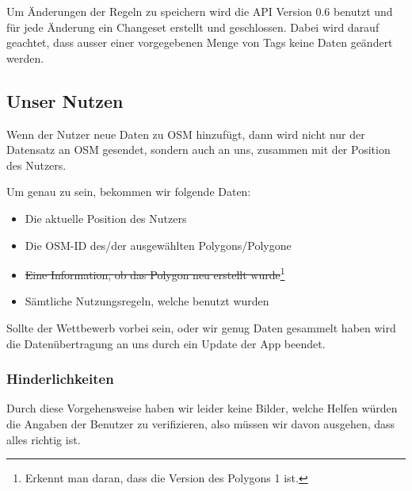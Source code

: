 Um Änderungen der Regeln zu speichern wird die API Version 0.6 benutzt und für jede Änderung ein Changeset erstellt und geschlossen.
Dabei wird darauf geachtet, dass ausser einer vorgegebenen Menge von Tags keine Daten geändert werden.

\subsection{Unser Nutzen}
Wenn der Nutzer neue Daten zu OSM hinzufügt, dann wird nicht nur der Datensatz an OSM gesendet, sondern auch an uns, zusammen mit der Position des Nutzers.

Um genau zu sein, bekommen wir folgende Daten:
\begin{itemize}
\item Die aktuelle Position des Nutzers
\item Die OSM-ID des/der ausgewählten Polygons/Polygone
\item \sout{Eine Information, ob das Polygon neu erstellt wurde}\footnote{Erkennt man daran, dass die Version des Polygons 1 ist.}
\item Sämtliche Nutzungsregeln, welche benutzt wurden
\end{itemize}
Sollte der Wettbewerb vorbei sein, oder wir genug Daten gesammelt haben wird die
Datenübertragung an uns durch ein Update der App beendet.



\subsubsection{Hinderlichkeiten}
Durch diese Vorgehensweise haben wir leider keine Bilder, welche Helfen würden die Angaben der Benutzer zu verifizieren,
also müssen wir davon ausgehen, dass alles richtig ist.
